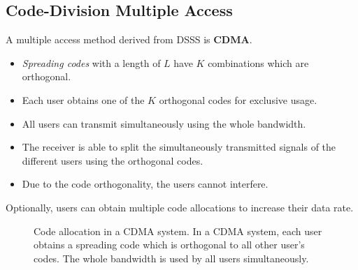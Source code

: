 \begin{refsection}
\subsection{Code-Division Multiple Access}

A multiple access method derived from \ac{DSSS} is  \textbf{\acf{CDMA}}.
\begin{itemize}
	\item \emph{Spreading codes} with a length of $L$ have $K$ combinations which are orthogonal.
	\item Each user obtains one of the $K$ orthogonal codes for exclusive usage.
	\item All users can transmit simultaneously using the whole bandwidth.
	\item The receiver is able to split the simultaneously transmitted signals of the different users using the orthogonal codes.
	\item Due to the code orthogonality, the users cannot interfere.
\end{itemize}

\begin{remark}
	Optionally, users can obtain multiple code allocations to increase their data rate.
\end{remark}

\begin{figure}[H]
	\centering
	\caption[Code allocation in a \acs{CDMA} system]{Code allocation in a \acs{CDMA} system. In a \acs{CDMA} system, each user obtains a spreading code which is orthogonal to all other user's codes. The whole bandwidth is used by all users simultaneously.}
\end{figure}


\end{refsection}

